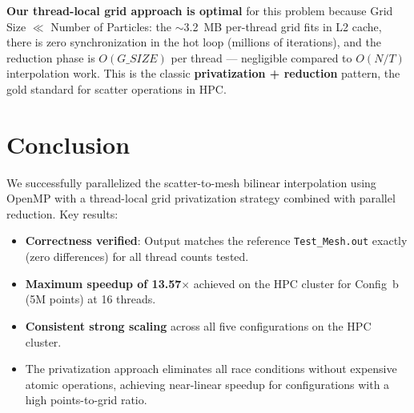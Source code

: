 \documentclass[12pt,a4paper]{article}
\begin{document}
\textbf{Our thread-local grid approach is optimal} for this problem because Grid Size $\ll$ Number of Particles: the $\sim$3.2~MB per-thread grid fits in L2 cache, there is zero synchronization in the hot loop (millions of iterations), and the reduction phase is $O(G\_SIZE)$ per thread --- negligible compared to $O(N/T)$ interpolation work. This is the classic \textbf{privatization + reduction} pattern, the gold standard for scatter operations in HPC.

\section{Conclusion}

We successfully parallelized the scatter-to-mesh bilinear interpolation using OpenMP with a thread-local grid privatization strategy combined with parallel reduction. Key results:

\begin{itemize}
    \item \textbf{Correctness verified}: Output matches the reference \texttt{Test\_Mesh.out} exactly (zero differences) for all thread counts tested.
    \item \textbf{Maximum speedup of 13.57$\times$} achieved on the HPC cluster for Config~b (5M points) at 16 threads.
    \item \textbf{Consistent strong scaling} across all five configurations on the HPC cluster.
    \item The privatization approach eliminates all race conditions without expensive atomic operations, achieving near-linear speedup for configurations with a high points-to-grid ratio.
\end{itemize}
\end{document}
